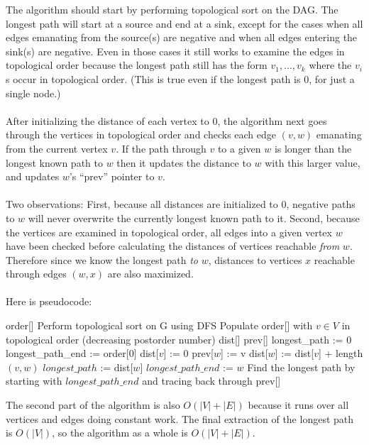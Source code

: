 \documentclass[11pt]{article}
\begin{document}
The algorithm should start by performing topological sort on the DAG. The longest path will start at a source and end at a sink, except for the cases when all edges emanating from the source(s) are negative and when all edges entering the sink(s) are negative. Even in those cases it still works to examine the edges in topological order because the longest path still has the form $v_1,\dots,v_k$ where the $v_i$s occur in topological order. (This is true even if the longest path is 0, for just a single node.)
\\
\\
After initializing the distance of each vertex to 0, the algorithm next goes through the vertices in topological order and checks each edge $(v,w)$ emanating from the current vertex $v$. If the path through $v$ to a given $w$ is longer than the longest known path to $w$ then it updates the distance to $w$ with this larger value, and updates $w$'s ``prev'' pointer to $v$. \\
\\
Two observations: First, because all distances are initialized to 0, negative paths to $w$ will never overwrite the currently longest known path to it. Second, because the vertices are examined in topological order, all edges into a given vertex $w$ have been checked before calculating the distances of vertices reachable \emph{from} $w$. Therefore since we know the longest path \emph{to} $w$, distances to vertices $x$ reachable through edges $(w,x)$ are also maximized. \\
\\
Here is pseudocode:
\begin{algorithmic}
\STATE order[]
\STATE Perform topological sort on G using DFS
\STATE Populate order[] with $v \in V$ in topological order (decreasing postorder number)
\STATE dist[]
\STATE prev[]
\STATE longest\_path := 0
\STATE longest\_path\_end := order[0]
	\STATE dist[$v$] := 0
\ENDFOR
{}
			\STATE prev[$w$] := v		
			\STATE dist[$w$] := dist[$v$] + length$(v,w)$
				\STATE $longest\_path$ := dist[$w$]
				\STATE $longest\_path\_end$ := $w$
			\ENDIF
		\ENDIF
	\ENDFOR
\ENDFOR
\STATE Find the longest path by starting with $longest\_path\_end$ and tracing back through prev[] 
\end{algorithmic}

 The second part of the algorithm is also $O(|V| + |E|)$ because it runs over all vertices and edges doing constant work. The final extraction of the longest path is $O(|V|)$, so the algorithm as a whole is $O(|V| + |E|)$.
\end{document}
